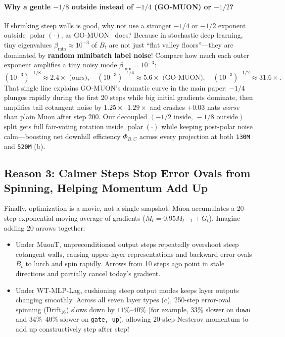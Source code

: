 \documentclass[11pt]{article}
\newcommand{\polar}{\operatorname{polar}}
\newcommand{\mname}[1]{#1}
\begin{document}
\paragraph{Why a gentle $-1/8$ outside instead of $-1/4$ (\mname{GO-MUON}) or $-1/2$?}
If shrinking steep walls is good, why not use a stronger $-1/4$ or $-1/2$ exponent outside $\polar(\cdot)$, as \mname{GO-MUON}~\citep{che2026gomuon} does?
Because in stochastic deep learning, tiny eigenvalues $\beta_{\min} \approx 10^{-3}$ of $B_t$ are not just ``flat valley floors''---they are dominated by \textbf{random minibatch label noise}!
Compare how much each outer exponent amplifies a tiny noisy mode $\beta_{\min} = 10^{-3}$:
\begin{equation}
  (10^{-3})^{-1/8} \approx \mathbf{2.4\times}\text{ (ours)},
  \quad
  (10^{-3})^{-1/4} \approx \mathbf{5.6\times}\text{ (\mname{GO-MUON})},
  \quad
  (10^{-3})^{-1/2} \approx \mathbf{31.6\times}.
  \label{eq:noise_amp}
\end{equation}
That single line explains \mname{GO-MUON}'s dramatic curve in the main paper: $-1/4$ plunges rapidly during the first $20$ steps while big initial gradients dominate, then amplifies tail cotangent noise by $1.25\times\text{--}1.29\times$ and crashes $+0.03$ nats \emph{worse} than plain \mname{Muon} after step $200$.
Our decoupled $(-1/2\text{ inside},\, -1/8\text{ outside})$ split gets full fair-voting rotation inside $\polar(\cdot)$ while keeping post-polar noise calm---boosting net downhill efficiency $\Phi_{B,C}$ across every projection at both \texttt{130M} and \texttt{520M} (b).

\subsection{Reason 3: Calmer Steps Stop Error Ovals from Spinning, Helping Momentum Add Up}
\label{sec:reason_drift}

Finally, optimization is a movie, not a single snapshot.
\mname{Muon} accumulates a 20-step exponential moving average of gradients ($M_t = 0.95 M_{t-1} + G_t$).
Imagine adding 20 arrows together:
\begin{itemize}[leftmargin=1.5em, itemsep=1.5pt, topsep=2pt]
  \item Under \mname{MuonT}, unpreconditioned output steps repeatedly overshoot steep cotangent walls, causing upper-layer representations and backward error ovals $B_t$ to lurch and spin rapidly. Arrows from 10 steps ago point in stale directions and partially cancel today's gradient.
  \item Under \mname{WT-MLP-Lag}, cushioning steep output modes keeps layer outputs changing smoothly. Across all seven layer types (c), 250-step error-oval spinning ($\mathrm{Drift}_{16}$) slows down by \textbf{$11\%\text{--}40\%$} (for example, $33\%$ slower on \texttt{down} and $34\%\text{--}40\%$ slower on \texttt{gate, up}), allowing 20-step Nesterov momentum to add up constructively step after step!
\end{itemize}
\end{document}
